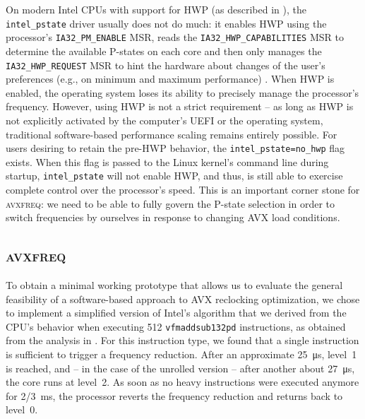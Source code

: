 On modern Intel \glspl{CPU} with support for \gls{HWP} (as described in ), the \texttt{intel\_pstate} driver usually does not do much: it enables \gls{HWP} using the processor's \texttt{IA32\_PM\_ENABLE} \gls{MSR}, reads the \texttt{IA32\_HWP\_CAPABILITIES} \gls{MSR} to determine the available \glspl{P-state} on each core and then only manages the \texttt{IA32\_HWP\_REQUEST} \gls{MSR} to hint the hardware about changes of the user's preferences (e.g., on minimum and maximum performance) \cite{intelsdmsysprogguide} \cite{intelpstate}. When \gls{HWP} is enabled, the operating system loses its ability to precisely manage the processor's frequency. However, using \gls{HWP} is not a strict requirement -- as long as \gls{HWP} is not explicitly activated by the computer's \gls{UEFI} or the operating system, traditional software-based performance scaling remains entirely possible. For users desiring to retain the pre-\gls{HWP} behavior, the \texttt{intel\_pstate=no\_hwp} flag exists. When this flag is passed to the Linux kernel's command line during startup, \texttt{intel\_pstate} will not enable \gls{HWP}, and thus, is still able to exercise complete control over the processor's speed. This is an important corner stone for \textsc{avxfreq}: we need to be able to fully govern the \gls{P-state} selection in order to switch frequencies by ourselves in response to changing \gls{AVX} load conditions.

\subsection{\textsc{avxfreq}}
\label{sec:design:reimplementation:avxfreq}

To obtain a minimal working prototype that allows us to evaluate the general feasibility of a software-based approach to \gls{AVX} reclocking optimization, we chose to implement a simplified version of Intel's algorithm that we derived from the \gls{CPU}'s behavior when executing \SI{512}{\bit} \texttt{vfmaddsub132pd} instructions, as obtained from the analysis in . For this instruction type, we found that a single instruction is sufficient to trigger a frequency reduction. After an approximate \SI{25}{\micro\second}, level~1 is reached, and -- in the case of the unrolled version -- after another about \SI{27}{\micro\second}, the core runs at level~2. As soon as no heavy instructions were executed anymore for \SI[quotient-mode=fraction]{2/3}{\milli\second}, the processor reverts the frequency reduction and returns back to level~0. %


